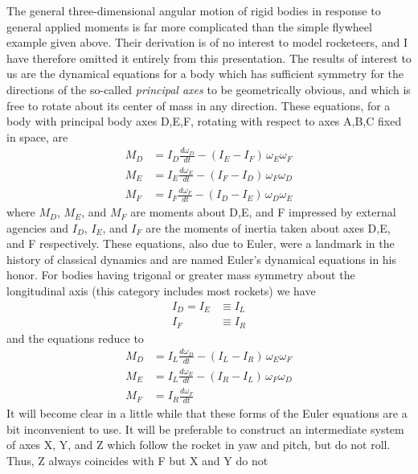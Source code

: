 The general three-dimensional angular motion of rigid bodies in response to
general applied moments is far more complicated than the simple flywheel
example given above. Their derivation is of no interest to model rocketeers,
and I have therefore omitted it entirely from this presentation. The results of
interest to us are the dynamical equations for a body which has sufficient
symmetry for the directions of the so-called \emph{principal axes} to be
geometrically obvious, and which is free to rotate about its center of mass in
any direction. These equations, for a body with principal body axes D,E,F,
rotating with respect to axes A,B,C fixed in space, are
\begin{equation}\label{ch2:eq:4}
\begin{split}
M_D &= I_D\frac{d\omega_D}{dt} - (I_E - I_F)\,\omega_E\omega_F\\
M_E &= I_E\frac{d\omega_E}{dt} - (I_F - I_D)\,\omega_F\omega_D\\
M_F &= I_F\frac{d\omega_F}{dt} - (I_D - I_E)\,\omega_D\omega_E
\end{split}
\end{equation}
where $M_D$, $M_E$, and $M_F$ are moments about D,E, and F impressed by
external agencies and $I_D$, $I_E$, and $I_F$ are the moments of inertia taken
about axes D,E, and F respectively. These equations, also due to Euler, were a
landmark in the history of classical dynamics and are named Euler's dynamical
equations in his honor. For bodies having trigonal or greater mass symmetry
about the longitudinal axis (this category includes most rockets) we have
\begin{align*}
I_D = I_E &\equiv I_L\\
I_F &\equiv I_R
\end{align*}
and the equations reduce to
\begin{equation}\label{ch2:eq:5}
\begin{split}
M_D &= I_L\frac{d\omega_D}{dt} - (I_L - I_R)\,\omega_E\omega_F\\
M_E &= I_L\frac{d\omega_E}{dt} - (I_R - I_L)\,\omega_F\omega_D\\
M_F &= I_R\frac{d\omega_F}{dt}
\end{split}
\end{equation}
It will become clear in a little while that these forms of the Euler equations
are a bit inconvenient to use. It will be preferable to construct an
intermediate system of axes X, Y, and Z which follow the rocket in yaw and
pitch, but do not roll. Thus, Z always coincides with F but X and Y do not
